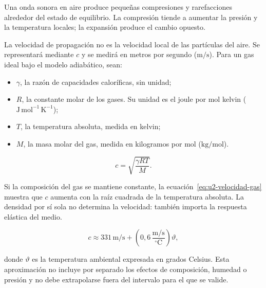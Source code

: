 Una onda sonora en aire produce pequeñas compresiones y rarefacciones alrededor del estado de equilibrio. La compresión tiende a aumentar la presión y la temperatura locales; la expansión produce el cambio opuesto. 

La velocidad de propagación no es la velocidad local de las partículas del aire. Se representará mediante \(c\) y se medirá en metros por segundo (\(\text{m}/\text{s}\)). Para un gas ideal bajo el modelo adiabático, sean:

\begin{itemize}
    \item \(\gamma\), la razón de capacidades caloríficas, sin unidad;
    \item \(R\), la constante molar de los gases. Su unidad es el joule por mol kelvin (\(\text{J}\,\text{mol}^{-1}\,\text{K}^{-1}\));
    \item \(T\), la temperatura absoluta, medida en kelvin;
    \item \(M\), la masa molar del gas, medida en kilogramos por mol (\(\text{kg}/\text{mol}\)).
\end{itemize}


\begin{equation}
    c=\sqrt{\frac{\gamma RT}{M}}.
    \label{eq:u2-velocidad-gas}
\end{equation}

Si la composición del gas se mantiene constante, la ecuación~\eqref{eq:u2-velocidad-gas} muestra que \(c\) aumenta con la raíz cuadrada de la temperatura absoluta. La densidad por sí sola no determina la velocidad: también importa la respuesta elástica del medio.


\begin{equation}
    c\approx
    331\,\text{m}/\text{s}
    +\left(0{,}6\,\frac{\text{m}/\text{s}}{^{\circ}\text{C}}\right)\vartheta,
    \label{eq:u2-velocidad-temperatura}
\end{equation}

donde \(\vartheta\) es la temperatura ambiental expresada en grados Celsius.
Esta aproximación no incluye por separado los efectos de composición, humedad
o presión y no debe extrapolarse fuera del intervalo para el que se valide.

